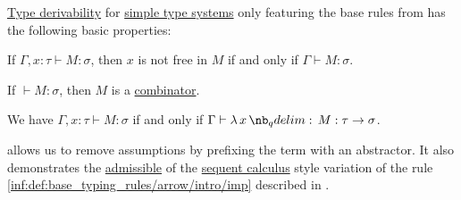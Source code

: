 \begin{proposition}\label{thm:def:simple_type_derivability}
  \hyperref[def:simple_type_derivability]{Type derivability} for \hyperref[def:simple_type_system]{simple type systems} only featuring the base rules from  has the following basic properties:
  \begin{thmenum}
     If \( \Gamma, x: \tau \vdash M: \sigma \), then \( x \) is not free in \( M \) if and only if \( \Gamma \vdash M: \sigma \).

     If \( {}\vdash M: \sigma \), then \( M \) is a \hyperref[def:lambda_combinator]{combinator}.

     We have \( \Gamma, x: \tau \vdash M: \sigma \) if and only if \( \Gamma \vdash \qabs x M: \tau \to \sigma \).
  \end{thmenum}
\end{proposition}
\begin{comments}
  \item {} allows us to remove assumptions by prefixing the term with an abstractor. It also demonstrates the \hyperref[con:inference_rule_admissibility]{admissible} of the \hyperref[rem:sequent_calculus]{sequent calculus} style variation of the rule \ref{inf:def:base_typing_rules/arrow/intro/imp} described in .
\end{comments}
